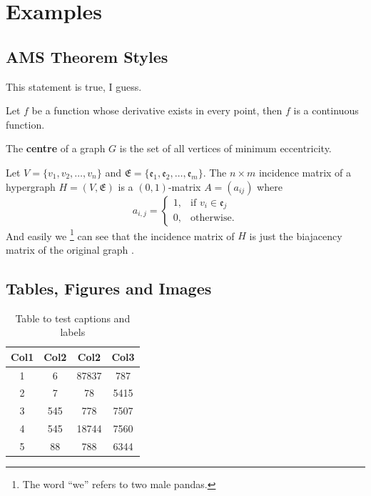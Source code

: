 \chapter{Examples}
\label{ch:ch1}

\section{AMS Theorem Styles}

\begin{remark}
	This statement is true, I guess.
\end{remark}

\begin{theorem}
	Let $f$ be a function whose derivative exists in every point, then $f$ is a continuous function.
\end{theorem}

\begin{definition}
	The \textbf{centre} of a graph $G$ is the set of all vertices of minimum eccentricity.
\end{definition}

Let $V = \{v_1, v_2, \dotsc, v_n\}$ and $\mathfrak{E} = \{\mathfrak{e}_1, \mathfrak{e}_2, \dotsc, \mathfrak{e}_m\}$. The $n \times m$ incidence matrix of a hypergraph $H = (V, \mathfrak{E})$ is a $(0, 1)$-matrix $A = (a_{ij})$ where
\begin{equation*}
	a_{i, j} =
	\begin{cases}
		1, & \text{if $v_i \in \mathfrak{e}_j$} \\
		0, & \text{otherwise.}
	\end{cases}
\end{equation*}
And easily we \footnote{The word ``we'' refers to two male pandas.} can see that the incidence matrix of $H$ is just the biajacency matrix of the original graph \cite[pp.~22]{tanenbaum2011computer}.

\section{Tables, Figures and Images}

\lipsum[1]

\begin{table}[ht]
	\centering
	\begin{tabular}{||c c c c||}
		\hline
		Col1 & Col2 & Col2 & Col3 \\ [0.5ex]
		\hline\hline
		1 & 6 & 87837 & 787 \\
		2 & 7 & 78 & 5415 \\
		3 & 545 & 778 & 7507 \\
		4 & 545 & 18744 & 7560 \\
		5 & 88 & 788 & 6344 \\ [1ex]
		\hline
	\end{tabular}
	\caption{Table to test captions and labels}
\end{table}

